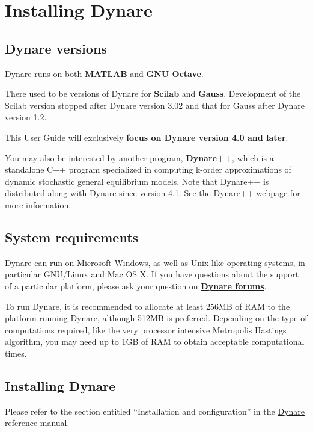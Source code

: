 \documentclass[10pt,math=newtx,citestyle=gb7714-2015,bibstyle=gb7714-2015]{elegantbook}
\begin{document}
	
	\chapter{Installing Dynare}
	
	\section{Dynare versions}
	
	Dynare runs on both \href{http://www.mathworks.com/products/matlab/}{\textbf{MATLAB}} and \href{http://www.octave.org}{\textbf{GNU Octave}}.
	
	There used to be versions of Dynare for \textbf{Scilab} and \textbf{Gauss}. Development of the Scilab version stopped after Dynare version 3.02 and that for Gauss after Dynare version 1.2.
	
	This User Guide will exclusively \textbf{focus on Dynare version 4.0 and later}.
	
	You may also be interested by another program, \textbf{Dynare++}, which is a standalone C++ program specialized in computing k-order approximations of dynamic stochastic general equilibrium models. Note that Dynare++ is distributed along with Dynare since version 4.1. See the \href{http://www.dynare.org/documentation-and-support/dynarepp}{Dynare++ webpage} for more information. 
	
	\section{System requirements}
	Dynare can run on Microsoft Windows, as well as Unix-like operating systems, in particular GNU/Linux and Mac OS X. If you have questions about the support of a particular platform, please ask your question on \href{http://www.dynare.org/phpBB3}{\textbf{Dynare forums}}.
	
	To run Dynare, it is recommended to allocate at least 256MB of RAM to the platform running Dynare, although 512MB is preferred. Depending on the type of computations required, like the very processor intensive Metropolis Hastings algorithm, you may need up to 1GB of RAM to obtain acceptable computational times.
	
	\section{Installing Dynare}
	
	Please refer to the section entitled ``Installation and configuration'' in the \href{http://www.dynare.org/documentation-and-support/manual}{Dynare reference manual}.
	
\end{document}

